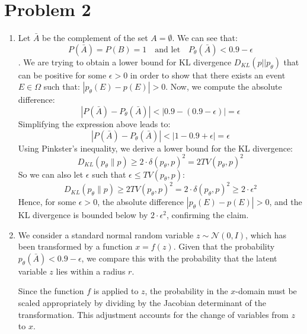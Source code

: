 \documentclass{article}
\begin{document}
\section*{Problem 2}
\begin{enumerate}
    \item 
    Let \( \bar{A} \) be the complement of the set \( A = \emptyset\). We can see that:
    \[
    P(\bar{A}) = P(B) = 1 \quad \text{and let} \quad P_{\theta}(\bar{A}) < 0.9 - \epsilon
    \]. 
    We are trying to obtain a lower bound for KL divergence $D_{KL}(p||p_\theta)$ that can be positive for some $ \epsilon> 0
    $ in order to show that there exists an event $E \in \Omega$ such that: 
    $ |p_{\theta}(E) - p(E)| > 0 $.
    Now, we compute the absolute difference:
    \[
    |P(\bar{A}) - P_{\theta}(\bar{A})| < |0.9 - (0.9 - \epsilon)| = \epsilon
    \]
    Simplifying the expression above leads to:
    \[
    |P(\bar{A}) - P_{\theta}(\bar{A})| < |1 - 0.9 + \epsilon| = \epsilon
    \]
    Using Pinkster’s inequality, we derive a lower bound for the KL divergence:
    \[
    D_{KL}(p_\theta \parallel p) \geq 2 \cdot \delta(p_{\theta}, p)^2 = 2 TV(p_\theta, p)^2
    \]
    So we can also let $\epsilon$ such that $\epsilon \leq TV(p_\theta, p)$:
    \[
    D_{KL}(p_\theta \parallel p) \geq  2 TV(p_\theta, p)^2=   2 \cdot \delta(p_{\theta}, p)^2  \geq 2 \cdot \epsilon^2
    \]
    Hence, for some \( \epsilon > 0 \), the absolute difference \( |p_{\theta}(E) - p(E)| > 0 \), and the KL divergence is bounded below by \( 2 \cdot \epsilon^2 \), confirming the claim.
    \item 
    We consider a standard normal random variable 
    \( z \sim \mathcal{N}(0, I) \), which has been transformed by a function 
    \( x = f(z) \). Given that the probability 
    \( p_\theta(\bar{A}) < 0.9 - \epsilon \), we compare this with the probability that the latent variable 
    \( z \) lies within a radius \( r \).
    
    Since the function \( f \) is applied to \( z \), the probability in the 
    \( x \)-domain must be scaled appropriately by dividing by the Jacobian determinant of the transformation. This adjustment accounts for the change of variables from 
    \( z \) to \( x \).


\end{enumerate}
\end{document}
